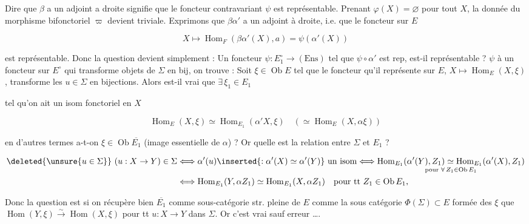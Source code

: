 Dire que $\beta$ a un adjoint a droite  signifie que  le foncteur contravariant $\psi$ est représentable. Prenant $\varphi(X)=\varnothing$ pour tout $X$, la donnée du morphisme bifonctoriel $\varpi$ devient triviale. Exprimons que $\beta\alpha'$ a un adjoint à droite, i.e. que le foncteur sur $E$

\[X\longmapsto\operatorname{Hom}_{F}(\beta\alpha'(X),a)=\psi(\alpha'(X))\]

est représentable. Donc la question devient simplement : Un foncteur $\psi:E_1^{\circ}\to(\mathrm{Ens})$ tel que $\psi\circ\alpha'$ est rep, est-il représentable ?  $\psi$ à un foncteur sur $E^{\circ}$ qui transforme objets de $\Sigma$ en bij, on trouve : Soit  $\xi\in\operatorname{Ob}E$ tel que le  foncteur qu'il représente sur $E$, $X\mapsto\operatorname{Hom}_E(X,\xi)$, transforme les $u\in\Sigma$  en bijections. Alors est-il vrai que $\exists\,\xi_1\in E_1$


tel qu'on ait un isom fonctoriel en $X$

\[\operatorname{Hom}_{E}(X,\xi)\simeq\operatorname{Hom}_{E_1}(\alpha'X,\xi)\quad(\simeq\operatorname{Hom}_{E}(X,\alpha\xi))\]

en d'autres termes a-t-on $\xi\in\operatorname{Ob}\overline{E_1}$ (image essentielle de $\alpha$) ? Or quelle est la relation entre $\Sigma$ et $E_1$ ?

\[
\begin{aligned}
\deleted{\unsure{u\in\Sigma}}\ (u:X\to Y)\in\Sigma
&\Longleftrightarrow\alpha'(u)\inserted{:\alpha'(X)\simeq\alpha'(Y)}\ \text{un isom}
\Longleftrightarrow\underset{\text{pour }\forall\, Z_1\in\operatorname{Ob}E_1}{\operatorname{Hom}_{E_1}(\alpha'(Y),Z_1)\simeq\operatorname{Hom}_{E_1}(\alpha'(X),Z_1)}\\
&\Longleftrightarrow\operatorname{Hom}_{E_1}(Y,\alpha Z_1)\simeq\operatorname{Hom}_{E_1}(X,\alpha Z_1)\quad\text{pour tt } Z_1\in\operatorname{Ob}E_1,
\end{aligned}
\]

Donc la question est si on récupère bien $\overline{E_1}$ comme sous-catégorie str. pleine de $E$ comme la sous catégorie   $\Phi(\Sigma)\subset E$ formée des $\xi$  que $\operatorname{Hom}(Y,\xi)\xrightarrow{\sim}\operatorname{Hom}(X,\xi)$ pour tt $u:X\to Y$ dans $\Sigma$. Or c'est vrai sauf erreur \ldots.


